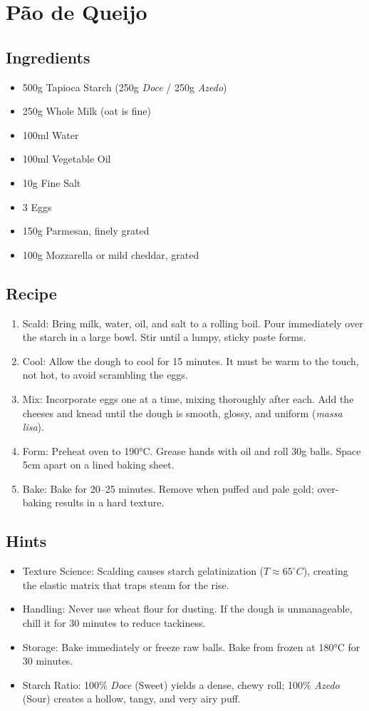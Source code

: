 \section{Pão de Queijo}
\subsection*{Ingredients}
\begin{itemize}
    \item 500g Tapioca Starch (250g \textit{Doce} / 250g \textit{Azedo})
    \item 250g Whole Milk (oat is fine)
    \item 100ml Water
    \item 100ml Vegetable Oil
    \item 10g Fine Salt
    \item 3 Eggs
    \item 150g Parmesan, finely grated
    \item 100g Mozzarella or mild cheddar, grated
\end{itemize}

\subsection*{Recipe}
\begin{enumerate}
    \item Scald: Bring milk, water, oil, and salt to a rolling boil. Pour immediately over the starch in a large bowl. Stir until a lumpy, sticky paste forms.
    \item Cool: Allow the dough to cool for 15 minutes. It must be warm to the touch, not hot, to avoid scrambling the eggs.
    \item Mix: Incorporate eggs one at a time, mixing thoroughly after each. Add the cheeses and knead until the dough is smooth, glossy, and uniform (\textit{massa lisa}).
    \item Form: Preheat oven to 190°C. Grease hands with oil and roll 30g balls. Space 5cm apart on a lined baking sheet.
    \item Bake: Bake for 20--25 minutes. Remove when puffed and pale gold; over-baking results in a hard texture.
\end{enumerate}

\subsection*{Hints}
\begin{itemize}
    \item Texture Science: Scalding causes starch gelatinization ($T \approx 65^\circ C$), creating the elastic matrix that traps steam for the rise.
    \item Handling: Never use wheat flour for dusting. If the dough is unmanageable, chill it for 30 minutes to reduce tackiness.
    \item Storage: Bake immediately or freeze raw balls. Bake from frozen at 180°C for 30 minutes.
    \item Starch Ratio: 100\% \textit{Doce} (Sweet) yields a dense, chewy roll; 100\% \textit{Azedo} (Sour) creates a hollow, tangy, and very airy puff.
\end{itemize}
\newpage